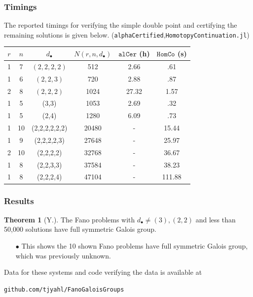 \documentclass{beamer}
\theoremstyle{definition}
\newtheorem{thm}{Theorem}
\begin{document}
\begin{frame}
\frametitle{Timings}
The reported timings for verifying the simple double point and certifying the remaining solutions is given below. (\texttt{alphaCertified},\texttt{HomotopyContinuation.jl})
\vspace{-.1cm}
\hspace{-.2cm}
\begin{minipage}{.99\textwidth}
\begin{table}[htb]
  \label{Small Fano}
  \def\arraystretch{.97}
  \begin{tabular}{||c|c|c|c|c|c||}
    \hline
    $r$ & $n$ & $d_\bullet$ & $N(r,n,d_\bullet)$ & $\texttt{alCer}$ (h) & $\texttt{HomCo}$ (s)\\
    \hline\hline
    1 & 7 & $(2,2,2,2)$ & 512 & 2.66 & .61\\
    \hline
    1 & 6 & $(2,2,3)$ & 720  & 2.88 & .87\\
    \hline
    2 & 8 & $(2,2,2)$ & 1024 & 27.32 & 1.57\\
    \hline
    1 & 5 & (3,3) & 1053 & 2.69 & .32\\
    \hline
    1 & 5 & (2,4) & 1280 & 6.09 & .73\\
    \hline
    1 & 10 & (2,2,2,2,2,2) & 20480 & - & 15.44\\
    \hline
    1 & 9 & (2,2,2,2,3) & 27648 & - & 25.97\\
    \hline
    2 & 10 & (2,2,2,2) & 32768 & - & 36.67\\
    \hline
    1 & 8 & (2,2,3,3) & 37584 & - & 38.23\\
    \hline
    1 & 8 & (2,2,2,4) & 47104 & - & 111.88\\
    \hline
  \end{tabular}
\end{table}
\end{minipage}
\end{frame}




\begin{frame}
\frametitle{Results}
\begin{thm}[Y.]
\vspace{.01cm}
The Fano problems with $d_\bullet\ne (3),(2,2)$ and less than 50,000 solutions have full symmetric Galois group.
\end{thm}

\begin{enumerate}
\item[$\bullet$] This shows the 10 shown Fano problems have full symmetric Galois group, which was previously unknown.
\end{enumerate}

Data for these systems and code verifying the data is available at 
\vspace{-.25cm}
\begin{center}
\texttt{github.com/tjyahl/FanoGaloisGroups}
\end{center}
\end{frame}
\end{document}
